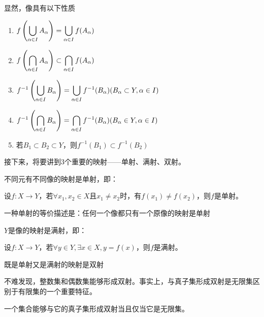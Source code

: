 显然，像具有以下性质

\begin{enumerate}
    \item $\displaystyle f\left(\bigcup_{\alpha \in I}A_\alpha \right)= \bigcup_{\alpha \in I}f(A_\alpha)$
    \item $\displaystyle f\left(\bigcap_{\alpha \in I}A_\alpha \right)\subset \bigcap_{\alpha \in I}f(A_\alpha)$
    \item $\displaystyle f^{-1}\left(\bigcup_{\alpha \in I}B_\alpha \right)= \bigcup_{\alpha \in I}f^{-1}(B_\alpha)(B_\alpha \subset Y,\alpha \in I)$
    \item $\displaystyle f^{-1}\left(\bigcap_{\alpha \in I}B_\alpha \right)= \bigcap_{\alpha \in I}f^{-1}(B_\alpha)(B_\alpha\in Y,\alpha \in I)$ 
    \item 若$B_1\subset B_2 \subset Y$，则$f^{-1}(B_1)\subset f^{-1}(B_2)$
\end{enumerate}

接下来，将要讲到3个重要的映射——单射、满射、双射。

\begin{definition}[单射]
    不同元有不同像的映射是单射，即：

    设$f:X\rightarrow Y$，若$\forall x_1,x_2 \in X\text{且}x_1 \neq x_2$时，有$f(x_1)\neq f(x_2)$，则$f$是单射。
\end{definition}

    一种单射的等价描述是：任何一个像都只有一个原像的映射是单射

\begin{definition}[满射]
    $Y$是像的映射是满射，即：

    设$f:X\rightarrow Y$，若$\forall y\in Y,\exists x\in X,y=f(x)$，则$f$是满射。
\end{definition}

\begin{definition}[双射]
    既是单射又是满射的映射是双射
\end{definition}

不难发现，整数集和偶数集能够形成双射。事实上，与真子集形成双射是无限集区别于有限集的一个重要特征。

\begin{proposition}
    一个集合能够与它的真子集形成双射当且仅当它是无限集。
\end{proposition}

